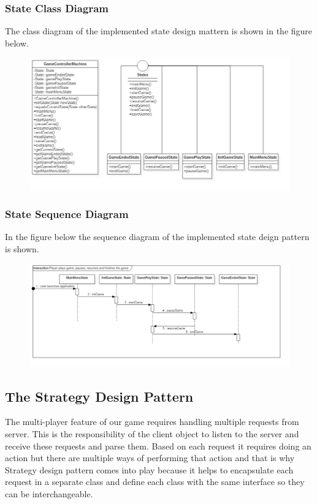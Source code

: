\documentclass{article}
\begin{document}
\newpage
\subsubsection{State Class Diagram}
The class diagram of the implemented state design mattern is shown in the figure below.
\begin{figure}[H]
\includegraphics[scale=0.50]{Images/StateMachineClassDiagram.jpg}
\end{figure}

\subsubsection{State Sequence Diagram}
In the figure below the sequence diagram of the implemented state deign pattern is shown.
\begin{figure}[H]
\includegraphics[scale=0.40]{Images/StateMachineSequenceDiagram.jpg}
\end{figure}

\subsection{The Strategy Design Pattern}
The multi-player feature of our game requires handling multiple requests from server. This is the responsibility of the client object to listen to the server and receive these requests and parse them. Based on each request it requires doing an action but there are multiple ways of performing that action and that is why Strategy design pattern comes into play because it helps to encapsulate each request in a separate class and define each class with the same interface so they can be interchangeable.
\end{document}
